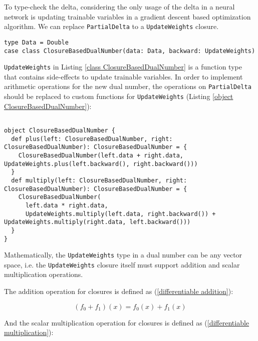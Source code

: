 To type-check the delta, considering the only usage of the delta in a neural network is updating \glspl{trainable variable} in a gradient descent based optimization algorithm. We can replace \lstinline{PartialDelta} to a \lstinline{UpdateWeights} closure.

\begin{lstlisting}[float={htbp},caption={Replacing \lstinline{PartialDelta} to a closure}, label={class ClosureBasedDualNumber}]
type Data = Double  
case class ClosureBasedDualNumber(data: Data, backward: UpdateWeights)
\end{lstlisting}

\lstinline{UpdateWeights} in Listing \ref{class ClosureBasedDualNumber} is a function type that contains side-effects to update \glspl{trainable variable}. In order to implement arithmetic operations for the new dual number, the operations on \lstinline{PartialDelta} should be replaced to custom functions for \lstinline{UpdateWeights} (Listing \ref{object ClosureBasedDualNumber}):

\begin{lstlisting}[float={htbp},caption={Replacing operations on \lstinline{PartialDelta} to custom functions for \lstinline{UpdateWeights}}, label={object ClosureBasedDualNumber}]  

object ClosureBasedDualNumber {
  def plus(left: ClosureBasedDualNumber, right: ClosureBasedDualNumber): ClosureBasedDualNumber = {
    ClosureBasedDualNumber(left.data + right.data, UpdateWeights.plus(left.backward(), right.backward()))
  }
  def multiply(left: ClosureBasedDualNumber, right: ClosureBasedDualNumber): ClosureBasedDualNumber = {
    ClosureBasedDualNumber(
      left.data * right.data,
      UpdateWeights.multiply(left.data, right.backward()) + UpdateWeights.multiply(right.data, left.backward()))
  }
}
\end{lstlisting}


Mathematically, the \lstinline{UpdateWeights} type in a dual number can be any vector space, i.e. the \lstinline{UpdateWeights} closure itself must support addition and scalar multiplication operations.

The addition operation for closures is defined as (\ref{differentiable addition}):

\begin{equation}
\label{differentiable addition}
(f_0 + f_1)(x) = f_0(x) + f_1(x)
\end{equation}

And the scalar multiplication operation for closures is defined as (\ref{differentiable multiplication}):

